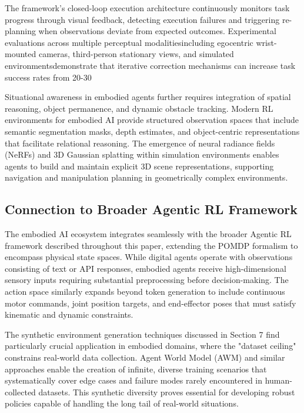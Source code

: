 The framework's closed-loop execution architecture continuously monitors task progress through visual feedback, detecting execution failures and triggering re-planning when observations deviate from expected outcomes. Experimental evaluations across multiple perceptual modalitiesincluding egocentric wrist-mounted cameras, third-person stationary views, and simulated environmentsdemonstrate that iterative correction mechanisms can increase task success rates from 20-30%

Situational awareness in embodied agents further requires integration of spatial reasoning, object permanence, and dynamic obstacle tracking. Modern RL environments for embodied AI provide structured observation spaces that include semantic segmentation masks, depth estimates, and object-centric representations that facilitate relational reasoning. The emergence of neural radiance fields (NeRFs) and 3D Gaussian splatting within simulation environments enables agents to build and maintain explicit 3D scene representations, supporting navigation and manipulation planning in geometrically complex environments.

\subsection{Connection to Broader Agentic RL Framework}

The embodied AI ecosystem integrates seamlessly with the broader Agentic RL framework described throughout this paper, extending the POMDP formalism to encompass physical state spaces. While digital agents operate with observations consisting of text or API responses, embodied agents receive high-dimensional sensory inputs requiring substantial preprocessing before decision-making. The action space similarly expands beyond token generation to include continuous motor commands, joint position targets, and end-effector poses that must satisfy kinematic and dynamic constraints.

The synthetic environment generation techniques discussed in Section 7 find particularly crucial application in embodied domains, where the "dataset ceiling" constrains real-world data collection. Agent World Model (AWM) and similar approaches enable the creation of infinite, diverse training scenarios that systematically cover edge cases and failure modes rarely encountered in human-collected datasets. This synthetic diversity proves essential for developing robust policies capable of handling the long tail of real-world situations.

